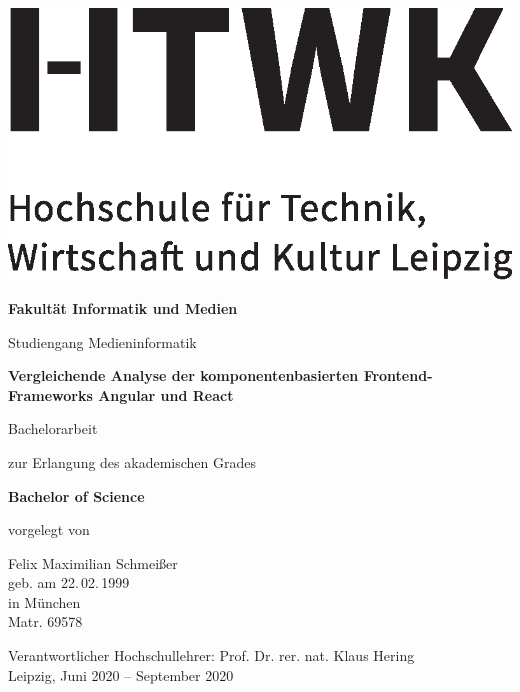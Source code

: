 \begin{titlepage}
{\centering
\includegraphics[scale=0.5]{Hilfsdateien/HTWK_logo.eps}\\
{\large \textbf{Fakultät Informatik und Medien} \par}
{\large Studiengang Medieninformatik \par}
\vspace{1.25cm}
{\Large \textbf{Vergleichende Analyse der komponentenbasierten Frontend-Frameworks Angular und React}\par}
\vspace{1.25cm}
{Bachelorarbeit \par}
{zur Erlangung des akademischen Grades \par} 
{\large  \textbf{Bachelor of Science} \par}
{vorgelegt von \par}
\vspace{1.25cm}
{Felix Maximilian Schmeißer\\[3ex]
geb. am 22.\,02.\,1999\\[3ex]
in München\\[3ex]
Matr. 69578 \par}}
\vfill
{\noindent Verantwortlicher Hochschullehrer: Prof. Dr. rer. nat. Klaus Hering\\
Leipzig, Juni 2020 -- September 2020}
\end{titlepage}
